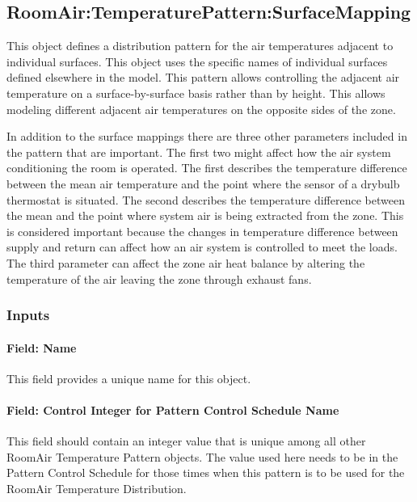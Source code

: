 \subsection{RoomAir:TemperaturePattern:SurfaceMapping}\label{roomairtemperaturepatternsurfacemapping}

This object defines a distribution pattern for the air temperatures adjacent to individual surfaces. This object uses the specific names of individual surfaces defined elsewhere in the model. This pattern allows controlling the adjacent air temperature on a surface-by-surface basis rather than by height. This allows modeling different adjacent air temperatures on the opposite sides of the zone.

In addition to the surface mappings there are three other parameters included in the pattern that are important. The first two might affect how the air system conditioning the room is operated. The first describes the temperature difference between the mean air temperature and the point where the sensor of a drybulb thermostat is situated. The second describes the temperature difference between the mean and the point where system air is being extracted from the zone. This is considered important because the changes in temperature difference between supply and return can affect how an air system is controlled to meet the loads. The third parameter can affect the zone air heat balance by altering the temperature of the air leaving the zone through exhaust fans.

\subsubsection{Inputs}\label{inputs-5-025}

\paragraph{Field: Name}\label{field-name-5-020}

This field provides a unique name for this object.

\paragraph{Field: Control Integer for Pattern Control Schedule Name}\label{field-control-integer-for-pattern-control-schedule-name-3}

This field should contain an integer value that is unique among all other RoomAir Temperature Pattern objects. The value used here needs to be in the Pattern Control Schedule for those times when this pattern is to be used for the RoomAir Temperature Distribution.

